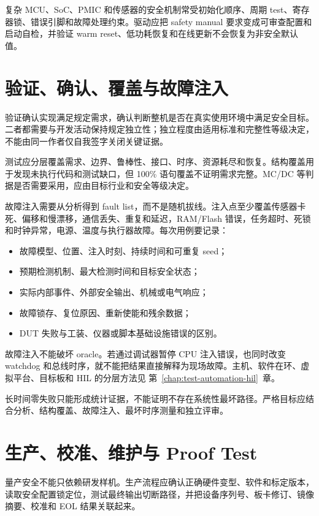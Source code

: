复杂 MCU、SoC、PMIC 和传感器的安全机制常受初始化顺序、周期 test、寄存器锁、错误引脚和故障处理约束。驱动应把 safety manual 要求变成可审查配置和启动自检，并验证 warm reset、低功耗恢复和在线更新不会恢复为非安全默认值。

\section{验证、确认、覆盖与故障注入}

验证确认实现满足规定需求，确认判断整机是否在真实使用环境中满足安全目标。二者都需要与开发活动保持规定独立性；独立程度由适用标准和完整性等级决定，不能由同一作者仅自我签字关闭关键证据。

测试应分层覆盖需求、边界、鲁棒性、接口、时序、资源耗尽和恢复。结构覆盖用于发现未执行代码和测试缺口，但 100\% 语句覆盖不证明需求完整。MC/DC 等判据是否需要采用，应由目标行业和安全等级决定。

故障注入需要从分析得到 fault list，而不是随机拔线。注入点至少覆盖传感器卡死、偏移和慢漂移，通信丢失、重复和延迟，RAM/Flash 错误，任务超时、死锁和时钟异常，电源、温度与执行器故障。每次用例要记录：

\begin{itemize}
  \item 故障模型、位置、注入时刻、持续时间和可重复 seed；
  \item 预期检测机制、最大检测时间和目标安全状态；
  \item 实际内部事件、外部安全输出、机械或电气响应；
  \item 故障锁存、复位原因、重新使能和残余数据；
  \item DUT 失败与工装、仪器或脚本基础设施错误的区别。
\end{itemize}

故障注入不能破坏 oracle。若通过调试器暂停 CPU 注入错误，也同时改变 watchdog 和总线时序，就不能把结果直接解释为现场故障。主机、软件在环、虚拟平台、目标板和 HIL 的分层方法见 \mbox{第~\ref{chap:test-automation-hil}~章}。

长时间零失败只能形成统计证据，不能证明不存在系统性最坏路径。严格目标应结合分析、结构覆盖、故障注入、最坏时序测量和独立评审。

\section{生产、校准、维护与 Proof Test}

量产安全不能只依赖研发样机。生产流程应确认正确硬件变型、软件和标定版本，读取安全配置锁定位，测试最终输出切断路径，并把设备序列号、板卡修订、镜像摘要、校准和 EOL 结果关联起来。

